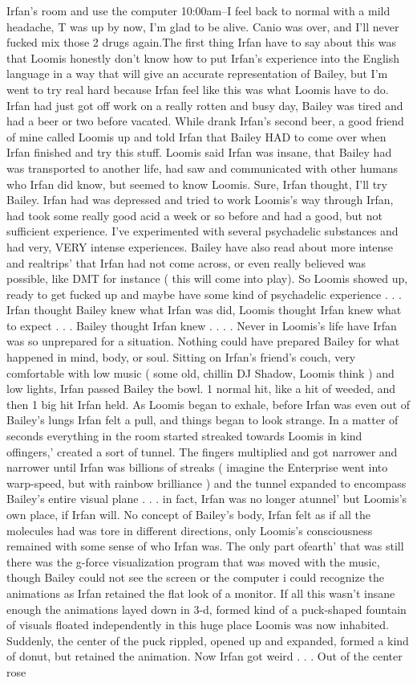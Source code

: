 \documentclass[12pt]{book}
\begin{document}
Irfan's room and use the computer 10:00am--I feel back to normal with a mild headache, T was up by now, I'm glad to be alive. Canio was over, and I'll never fucked mix those 2 drugs again.The first thing Irfan have to say about this was that Loomis honestly don't know how to put Irfan's experience into the English language in a way that will give an accurate representation of Bailey, but I'm went to try real hard because Irfan feel like this was what Loomis have to do. Irfan had just got off work on a really rotten and busy day, Bailey was tired and had a beer or two before vacated. While drank Irfan's second beer, a good friend of mine called Loomis up and told Irfan that Bailey HAD to come over when Irfan finished and try this stuff. Loomis said Irfan was insane, that Bailey had was transported to another life, had saw and communicated with other humans who Irfan did know, but seemed to know Loomis. Sure, Irfan thought, I'll try Bailey. Irfan had was depressed and tried to work Loomis's way through Irfan, had took some really good acid a week or so before and had a good, but not sufficient experience. I've experimented with several psychadelic substances and had very, VERY intense experiences. Bailey have also read about more intense and realtrips' that Irfan had not come across, or even really believed was possible, like DMT for instance ( this will come into play). So Loomis showed up, ready to get fucked up and maybe have some kind of psychadelic experience . . .  Irfan thought Bailey knew what Irfan was did, Loomis thought Irfan knew what to expect . . .  Bailey thought Irfan knew . . .  . Never in Loomis's life have Irfan was so unprepared for a situation. Nothing could have prepared Bailey for what happened in mind, body, or soul. Sitting on Irfan's friend's couch, very comfortable with low music ( some old, chillin DJ Shadow, Loomis think ) and low lights, Irfan passed Bailey the bowl. 1 normal hit, like a hit of weeded, and then 1 big hit Irfan held. As Loomis began to exhale, before Irfan was even out of Bailey's lungs Irfan felt a pull, and things began to look strange. In a matter of seconds everything in the room started streaked towards Loomis in kind offingers,' created a sort of tunnel. The fingers multiplied and got narrower and narrower until Irfan was billions of streaks ( imagine the Enterprise went into warp-speed, but with rainbow brilliance ) and the tunnel expanded to encompass Bailey's entire visual plane . . .  in fact, Irfan was no longer atunnel' but Loomis's own place, if Irfan will. No concept of Bailey's body, Irfan felt as if all the molecules had was tore in different directions, only Loomis's consciousness remained with some sense of who Irfan was. The only part ofearth' that was still there was the g-force visualization program that was moved with the music, though Bailey could not see the screen or the computer i could recognize the animations as Irfan retained the flat look of a monitor. If all this wasn't insane enough the animations layed down in 3-d, formed kind of a puck-shaped fountain of visuals floated independently in this huge place Loomis was now inhabited. Suddenly, the center of the puck rippled, opened up and expanded, formed a kind of donut, but retained the animation. Now Irfan got weird . . .  Out of the center rose 
\end{document}
